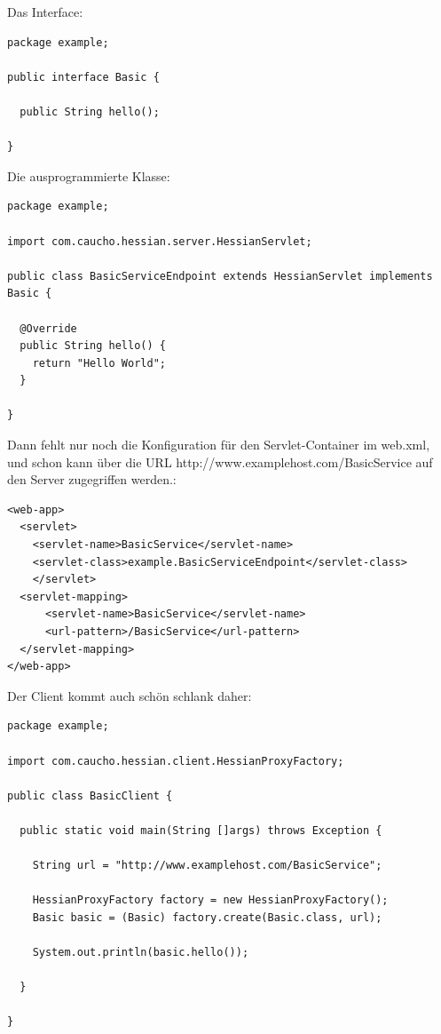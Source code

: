 \documentclass[abstracton, listof=totocnumbered,
bibliography=totocnumbered]{scrreprt}
\begin{document}
  Das Interface:
  
\begin{verbatim}
package example;  

public interface Basic {

  public String hello();
  
}
\end{verbatim}

  Die ausprogrammierte Klasse:

\begin{verbatim}
package example;  
  
import com.caucho.hessian.server.HessianServlet;

public class BasicServiceEndpoint extends HessianServlet implements Basic {

  @Override
  public String hello() {
    return "Hello World";
  }
      
}
\end{verbatim}

  Dann fehlt nur noch die Konfiguration für den Servlet-Container im web.xml,
  und schon kann über die \ac{URL} http://www.examplehost.com/BasicService auf
  den Server zugegriffen werden.:
  
\begin{verbatim}
<web-app>  
  <servlet>
    <servlet-name>BasicService</servlet-name>
    <servlet-class>example.BasicServiceEndpoint</servlet-class>
    </servlet>
  <servlet-mapping>
      <servlet-name>BasicService</servlet-name>
      <url-pattern>/BasicService</url-pattern>
  </servlet-mapping>
</web-app>
\end{verbatim}

  Der Client kommt auch schön schlank daher:

\begin{verbatim}  
package example;

import com.caucho.hessian.client.HessianProxyFactory;

public class BasicClient {

  public static void main(String []args) throws Exception {
  
    String url = "http://www.examplehost.com/BasicService";

    HessianProxyFactory factory = new HessianProxyFactory();
    Basic basic = (Basic) factory.create(Basic.class, url);

    System.out.println(basic.hello());
    
  }
  
}
\end{verbatim}  
  
\end{document}
